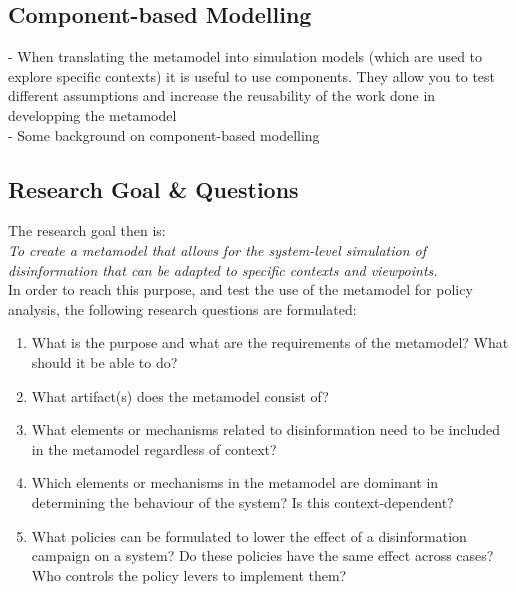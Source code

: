 \subsection{Component-based Modelling}
- When translating the metamodel into simulation models (which are used to explore specific contexts) it is useful to use components. They allow you to test different assumptions and increase the reusability of the work done in developping the metamodel \\
- Some background on component-based modelling



\subsection{Research Goal \& Questions}
The research goal then is: \\

\textit{To create a metamodel that allows for the system-level simulation of disinformation that can be adapted to specific contexts and viewpoints.} \\

In order to reach this purpose, and test the use of the metamodel for policy analysis, the following research questions are formulated: 
\begin{enumerate}
	\item What is the purpose and what are the requirements of the metamodel? What should it be able to do?
	\item What artifact(s) does the metamodel consist of?
	\item What elements or mechanisms related to disinformation need to be included in the metamodel regardless of context? %
	\item Which elements or mechanisms in the metamodel are dominant in determining the behaviour of the system? Is this context-dependent?
	\item What policies can be formulated to lower the effect of a disinformation campaign on a system? Do these policies have the same effect across cases? Who controls the policy levers to implement them?
\end{enumerate}



